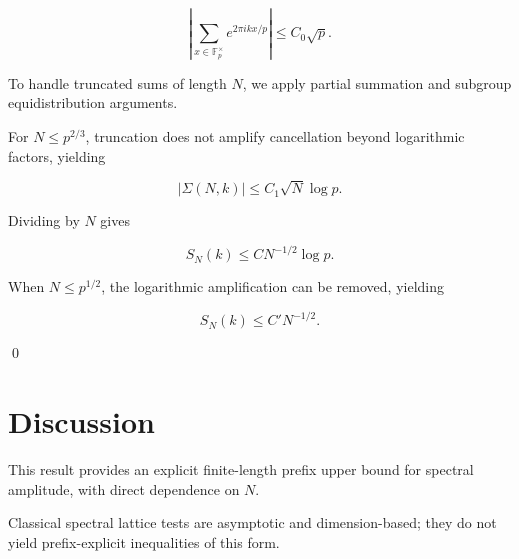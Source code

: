 \documentclass[11pt]{article}
\begin{document}
\[
\left|
\sum_{x \in \mathbb{F}_p^\times}
e^{2\pi i k x / p}
\right|
\le C_0 \sqrt{p}.
\]

To handle truncated sums of length $N$,
we apply partial summation and subgroup
equidistribution arguments.

For $N \le p^{2/3}$,
truncation does not amplify cancellation beyond
logarithmic factors, yielding

\[
|\Sigma(N,k)| \le C_1 \sqrt{N} \log p.
\]

Dividing by $N$ gives

\[
S_N(k) \le C N^{-1/2} \log p.
\]

When $N \le p^{1/2}$,
the logarithmic amplification can be removed,
yielding

\[
S_N(k) \le C' N^{-1/2}.
\]

\qed

\section*{Discussion}

This result provides an explicit finite-length
prefix upper bound for spectral amplitude,
with direct dependence on $N$.

Classical spectral lattice tests are asymptotic
and dimension-based; they do not yield
prefix-explicit inequalities of this form.
\end{document}
